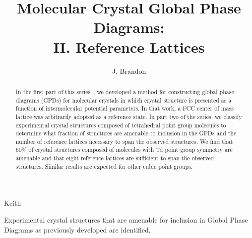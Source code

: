 \documentclass{iucr}              %
\begin{document}

\title{Molecular Crystal Global Phase Diagrams:\\ II. Reference Lattices}

\author[a,b]{J. Brandon}{Keith}%



\maketitle                        %

\begin{synopsis}
Experimental crystal structures that are amenable for inclusion in Global Phase Diagrams as previously developed are identified.  
\end{synopsis}

\begin{abstract}
In the first part of this series~\cite{Keith04c,Mettes04}, we developed a method for constructing global phase diagrams  (GPDs) for molecular crystals in which crystal structure is presented as a function of intermolecular potential parameters.  In that work, a FCC center of mass lattice was arbitrarily adopted as a reference state.  In part two of the series, we classify experimental crystal structures composed of tetrahedral point group molecules to determine what fraction of structures are amenable to inclusion in the GPDs and the number of reference lattices necessary to span the observed structures.  We find that 60\% of crystal structures composed of molecules with Td point group symmetry are amenable and that eight reference lattices are sufficient to span the observed structures.  Similar results are expected for other cubic point groups.
\end{abstract}

\pagebreak
\end{document}
